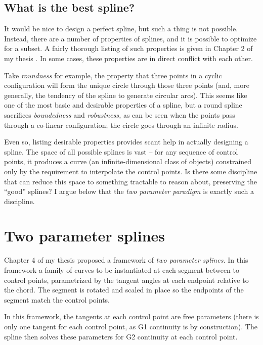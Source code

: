 \documentclass{article}
\begin{document}
\subsection{What is the best spline?}

It would be nice to design a perfect spline, but such a thing is not possible. Instead, there are a number of properties of splines, and it is possible to optimize for a subset. A fairly thorough listing of such properties is given in Chapter 2 of my thesis \cite{Lev09}. In some cases, these properties are in direct conflict with each other.

Take \emph{roundness} for example, the property that three points in a cyclic configuration will form the unique circle through those three points (and, more generally, the tendency of the spline to generate circular arcs). This seems like one of the most basic and desirable properties of a spline, but a round spline sacrifices \emph{boundedness} and \emph{robustness,} as can be seen when the points pass through a co-linear configuration; the circle goes through an infinite radius.

Even so, listing desirable properties provides scant help in actually designing a spline. The space of all possible splines is vast -- for any sequence of control points, it produces a curve (an infinite-dimensional class of objects) constrained only by the requirement to interpolate the control points. Is there some discipline that can reduce this space to something tractable to reason about, preserving the ``good'' splines? I argue below that the \emph{two parameter paradigm} is exactly such a discipline.

\section{Two parameter splines}

Chapter 4 of my thesis \cite{Lev09} proposed a framework of \emph{two parameter splines.} In this framework a family of curves to be instantiated at each segment between to control points, parametrized by the tangent angles at each endpoint relative to the chord. The segment is rotated and scaled in place so the endpoints of the segment match the control points.

In this framework, the tangents at each control point are free parameters (there is only one tangent for each control point, as G1 continuity is by construction). The spline then solves these parameters for G2 continuity at each control point.
\end{document}
